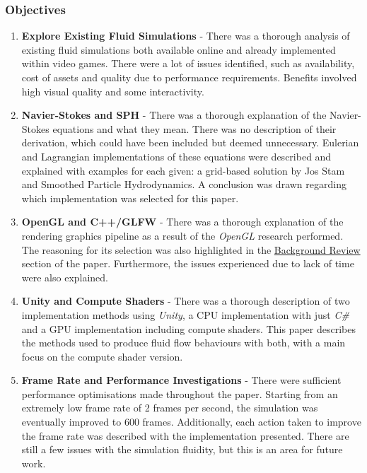 \documentclass[a4paper, 12pt]{article}
\begin{document}
    \subsubsection{Objectives}

    \begin{enumerate}
        \item \textbf{Explore Existing Fluid Simulations} - There was a thorough analysis of existing fluid simulations both available online and already implemented within video games. There were a lot of issues identified, such as availability, cost of assets and quality due to performance requirements. Benefits involved high visual quality and some interactivity.
        \item \textbf{Navier-Stokes and SPH} - There was a thorough explanation of the Navier-Stokes equations and what they mean. There was no description of their derivation, which could have been included but deemed unnecessary. Eulerian and Lagrangian implementations of these equations were described and explained with examples for each given: a grid-based solution by Jos Stam and Smoothed Particle Hydrodynamics. A conclusion was drawn regarding which implementation was selected for this paper.
        \item \textbf{OpenGL and C++/GLFW} - There was a thorough explanation of the rendering graphics pipeline as a result of the \textit{OpenGL} research performed. The reasoning for its selection was also highlighted in the \hyperref[sec:backgroundreview]{Background Review} section of the paper. Furthermore, the issues experienced due to lack of time were also explained.
        \item \textbf{Unity and Compute Shaders} - There was a thorough description of two implementation methods using \textit{Unity}, a CPU implementation with just \textit{C\#} and a GPU implementation including compute shaders. This paper describes the methods used to produce fluid flow behaviours with both, with a main focus on the compute shader version.
        \item \textbf{Frame Rate and Performance Investigations} - There were sufficient performance optimisations made throughout the paper. Starting from an extremely low frame rate of 2 frames per second, the simulation was eventually improved to 600 frames. Additionally, each action taken to improve the frame rate was described with the implementation presented. There are still a few issues with the simulation fluidity, but this is an area for future work.
    \end{enumerate}
\end{document}
